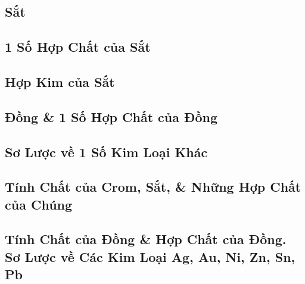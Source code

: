 \documentclass{article}
\numberwithin{equation}{section}
\begin{document}

\subsection{Sắt}


\subsection{1 Số Hợp Chất của Sắt}


\subsection{Hợp Kim của Sắt}


\subsection{Đồng \& 1 Số Hợp Chất của Đồng}


\subsection{Sơ Lược về 1 Số Kim Loại Khác}


\subsection{Tính Chất của Crom, Sắt, \& Những Hợp Chất của Chúng}


\subsection{Tính Chất của Đồng \& Hợp Chất của Đồng. Sơ Lược về Các Kim Loại Ag, Au, Ni, Zn, Sn, Pb}

\end{document}

